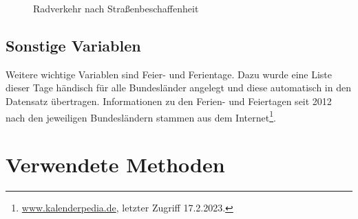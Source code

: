 \documentclass[a4paper,12pt]{thesis}
\begin{document}
\begin{figure}[!ht]%
	\centering
	\qquad
	\caption{Radverkehr nach Straßenbeschaffenheit}
	\label{VerkehrnachTypen}%
\end{figure}

\section{Sonstige Variablen}

Weitere wichtige Variablen sind Feier- und Ferientage. Dazu wurde eine Liste dieser Tage händisch für alle Bundesländer angelegt und diese automatisch in den Datensatz übertragen. Informationen zu den Ferien- und Feiertagen seit 2012 nach den jeweiligen Bundesländern stammen aus dem Internet\footnote{\url{www.kalenderpedia.de}, letzter Zugriff 17.2.2023.}.

\chapter{Verwendete Methoden}
\end{document}
